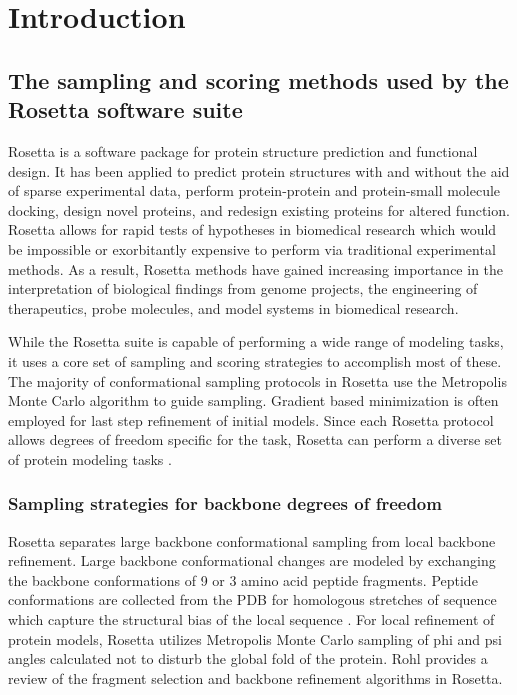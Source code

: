\chapter{Introduction}
\label{chap:introduction}
\section{The sampling and scoring methods used by the Rosetta software suite}
\label{sec:rosetta_intro}
Rosetta is a software package for protein structure prediction and functional design.
It has been applied to predict protein structures with and without the aid of sparse experimental data, perform protein-protein and protein-small molecule docking, design novel proteins, and redesign existing proteins for altered function.
Rosetta allows for rapid tests of hypotheses in biomedical research which would be impossible or exorbitantly expensive to perform via traditional experimental methods.
As a result, Rosetta methods have gained increasing importance in the interpretation of biological findings from genome projects, the engineering of therapeutics, probe molecules, and model systems in biomedical research.

While the Rosetta suite is capable of performing a wide range of modeling tasks, it uses a core set of sampling and scoring strategies to accomplish most of these.
The majority of conformational sampling protocols in Rosetta use the Metropolis Monte Carlo algorithm to guide sampling.
Gradient based minimization is often employed for last step refinement of initial models.
Since each Rosetta protocol allows degrees of freedom specific for the task, Rosetta can perform a diverse set of protein modeling tasks  \citep{Wang:2007du}.

\subsection{Sampling strategies for backbone degrees of freedom}
Rosetta separates large backbone conformational sampling from local backbone refinement.
Large backbone conformational changes are modeled by exchanging the backbone conformations of 9 or 3 amino acid peptide fragments.
Peptide conformations are collected from the \ac{PDB} for homologous stretches of sequence  \citep{Simons:1997do} which capture the structural bias of the local sequence  \citep{Bystroff:1996vl}.
For local refinement of protein models, Rosetta utilizes Metropolis Monte Carlo sampling of phi and psi angles calculated not to disturb the global fold of the protein.
Rohl  \citep{Rohl:2004dh} provides a review of the fragment selection and backbone refinement algorithms in Rosetta.


